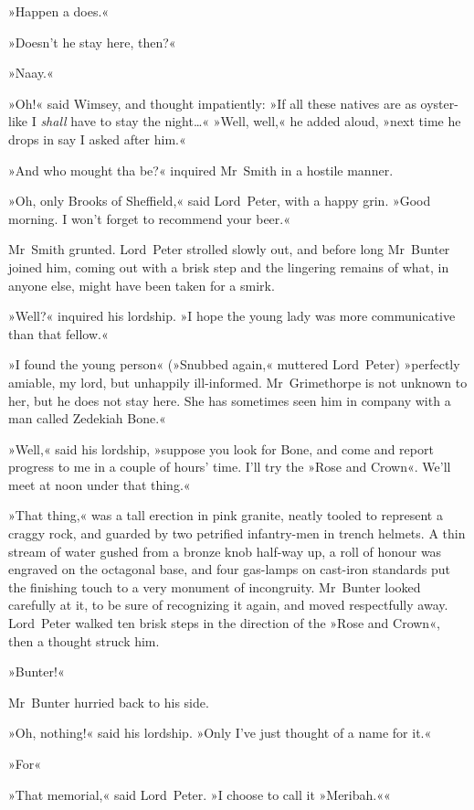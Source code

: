 »Happen a does.«

»Doesn't he stay here, then?«

»Naay.«

»Oh!« said Wimsey, and thought impatiently: »If all these natives are as oyster-like I \textit{shall} have to stay the night\dots« »Well, well,« he added aloud, »next time he drops in say I asked after him.«

»And who mought tha be?« inquired Mr~Smith in a hostile manner.

»Oh, only Brooks of Sheffield,« said Lord~Peter, with a happy grin. »Good morning. I won't forget to recommend your beer.«

Mr~Smith grunted. Lord~Peter strolled slowly out, and before long Mr~Bunter joined him, coming out with a brisk step and the lingering remains of what, in anyone else, might have been taken for a smirk.

»Well?« inquired his lordship. »I hope the young lady was more communicative than that fellow.«

»I found the young person« (»Snubbed again,« muttered Lord~Peter) »perfectly amiable, my lord, but unhappily ill-informed. Mr~Grimethorpe is not unknown to her, but he does not stay here. She has sometimes seen him in company with a man called Zedekiah Bone.«

»Well,« said his lordship, »suppose you look for Bone, and come and report progress to me in a couple of hours' time. I'll try the »Rose and Crown«. We'll meet at noon under that thing.«

»That thing,« was a tall erection in pink granite, neatly tooled to represent a craggy rock, and guarded by two petrified infantry-men in trench helmets. A thin stream of water gushed from a bronze knob half-way up, a roll of honour was engraved on the octagonal base, and four gas-lamps on cast-iron standards put the finishing touch to a very monument of incongruity. Mr~Bunter looked carefully at it, to be sure of recognizing it again, and moved respectfully away. Lord~Peter walked ten brisk steps in the direction of the »Rose and Crown«, then a thought struck him.

»Bunter!«

Mr~Bunter hurried back to his side.

»Oh, nothing!« said his lordship. »Only I've just thought of a name for it.«

»For\longdash«

»That memorial,« said Lord~Peter. »I choose to call it »Meribah.««


